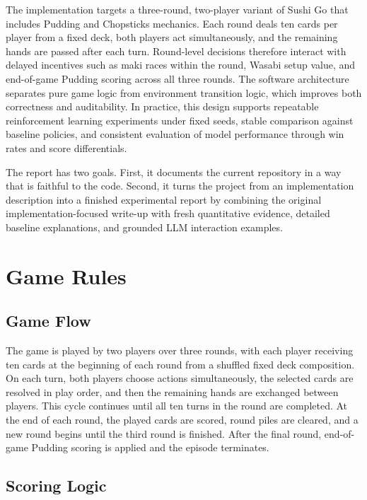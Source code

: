 \documentclass[10pt]{article}
\begin{document}
The implementation targets a three-round, two-player variant of Sushi Go that includes Pudding and Chopsticks mechanics. Each round deals ten cards per player from a fixed deck, both players act simultaneously, and the remaining hands are passed after each turn. Round-level decisions therefore interact with delayed incentives such as maki races within the round, Wasabi setup value, and end-of-game Pudding scoring across all three rounds. The software architecture separates pure game logic from environment transition logic, which improves both correctness and auditability. In practice, this design supports repeatable reinforcement learning experiments under fixed seeds, stable comparison against baseline policies, and consistent evaluation of model performance through win rates and score differentials.

The report has two goals. First, it documents the current repository in a way that is faithful to the code. Second, it turns the project from an implementation description into a finished experimental report by combining the original implementation-focused write-up with fresh quantitative evidence, detailed baseline explanations, and grounded LLM interaction examples.

\section{Game Rules}

\subsection{Game Flow}

The game is played by two players over three rounds, with each player receiving ten cards at the beginning of each round from a shuffled fixed deck composition. On each turn, both players choose actions simultaneously, the selected cards are resolved in play order, and then the remaining hands are exchanged between players. This cycle continues until all ten turns in the round are completed. At the end of each round, the played cards are scored, round piles are cleared, and a new round begins until the third round is finished. After the final round, end-of-game Pudding scoring is applied and the episode terminates.

\subsection{Scoring Logic}
\end{document}
